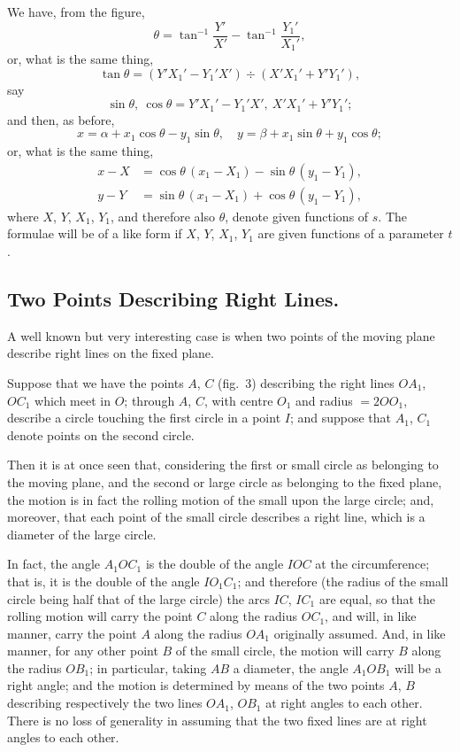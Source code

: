 \documentclass[11pt,a4paper]{book}
\begin{document}
We have, from the figure,
\[
\theta = \tan^{-1}\frac{Y'}{X'} - \tan^{-1}\frac{Y_1'}{X_1'},
\]
or, what is the same thing,
\[
\tan\theta = (Y'X_1' - Y_1'X') \div (X'X_1' + Y'Y_1'),
\]
say
\[
\sin\theta,\ \cos\theta = Y'X_1'-Y_1'X',\ X'X_1'+Y'Y_1';
\]
and then, as before,
\[
x = \alpha + x_1\cos\theta - y_1\sin\theta,\quad
y = \beta + x_1\sin\theta + y_1\cos\theta;
\]
or, what is the same thing,
\begin{align*}
x - X &= \cos\theta\,(x_1-X_1) - \sin\theta\,(y_1-Y_1),\\
y - Y &= \sin\theta\,(x_1-X_1) + \cos\theta\,(y_1-Y_1),
\end{align*}
where $X$, $Y$, $X_1$, $Y_1$, and therefore also $\theta$, denote given functions
of $s$. The formulae will be of a like form if $X$, $Y$, $X_1$, $Y_1$ are
given functions of a parameter $t$.

\subsection*{Two Points Describing Right Lines.}

A well known but very interesting case is when two points of the moving
plane describe right lines on the fixed plane.

Suppose that we have the points $A$, $C$ (fig.~3) describing the right
lines $OA_1$, $OC_1$ which meet in $O$; through $A$, $C$, with centre $O_1$
and radius $=2OO_1$, describe a circle touching the first circle in a point $I$;
and suppose that $A_1$, $C_1$ denote points on the second circle.

Then it is at once seen that, considering the first or small circle as
belonging to the moving plane, and the second or large circle as belonging
to the fixed plane, the motion is in fact the rolling motion of the small upon
the large circle; and, moreover, that each point of the small circle describes
a right line, which is a diameter of the large circle.

In fact, the angle $A_1OC_1$ is the double of the angle $IOC$ at the
circumference; that is, it is the double of the angle $IO_1C_1$; and therefore
(the radius of the small circle being half that of the large circle) the arcs
$IC$, $IC_1$ are equal, so that the rolling motion will carry the point $C$ along
the radius $OC_1$, and will, in like manner, carry the point $A$ along the
radius $OA_1$ originally assumed. And, in like manner, for any other point
$B$ of the small circle, the motion will carry $B$ along the radius $OB_1$;
in particular, taking $AB$ a diameter, the angle $A_1OB_1$ will be a right
angle; and the motion is determined by means of the two points $A$, $B$
describing respectively the two lines $OA_1$, $OB_1$ at right angles to each
other. There is no loss of generality in assuming that the two fixed lines
are at right angles to each other.
\end{document}
